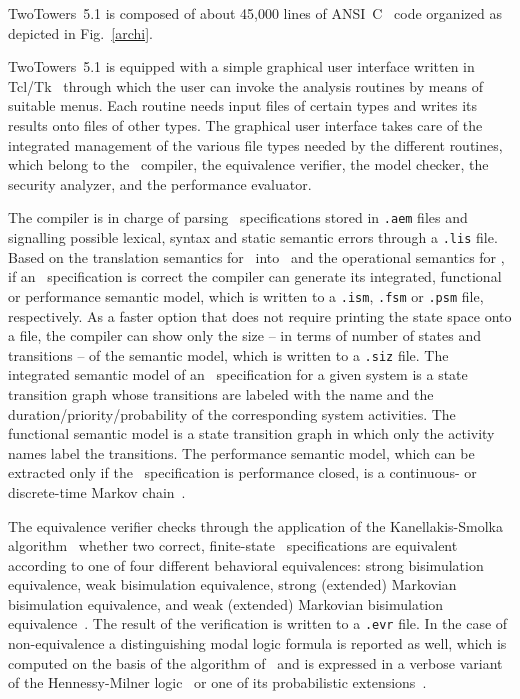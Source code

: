 TwoTowers~5.1 is composed of about 45,000 lines of ANSI~C~\cite{KR} code organized as depicted in
Fig.~\ref{archi}.

TwoTowers~5.1 is equipped with a simple graphical user interface written in Tcl/Tk~\cite{Ous} through which
the user can invoke the analysis routines by means of suitable menus. Each routine needs input files of
certain types and writes its results onto files of other types. The graphical user interface takes care of
the integrated management of the various file types needed by the different routines, which belong to the
\aemilia\ compiler, the equivalence verifier, the model checker, the security analyzer, and the performance
evaluator.

The compiler is in charge of parsing \aemilia\ specifications stored in {\tt .aem} files and signalling
possible lexical, syntax and static semantic errors through a {\tt .lis} file. Based on the translation
semantics for \aemilia\ into \empagr\ and the operational semantics for \empagr, if an \aemilia\
specification is correct the compiler can generate its integrated, functional or performance semantic model,
which is written to a {\tt .ism}, {\tt .fsm} or {\tt .psm} file, respectively. As a faster option that does
not require printing the state space onto a file, the compiler can show only the size -- in terms of number
of states and transitions -- of the semantic model, which is written to a {\tt .siz} file. The integrated
semantic model of an \aemilia\ specification for a given system is a state transition graph whose
transitions are labeled with the name and the duration/priority/probability of the corresponding system
activities. The functional semantic model is a state transition graph in which only the activity names label
the transitions. The performance semantic model, which can be extracted only if the \aemilia\ specification
is performance closed, is a continuous- or discrete-time Markov chain~\cite{Ste1}.

The equivalence verifier checks through the application of the Kanellakis-Smolka algorithm~\cite{KS}
whether two correct, finite-state \aemilia\ specifications are equivalent according to one of four different
behavioral equivalences: strong bisimulation equivalence, weak bisimulation equivalence, strong (extended)
Markovian bisimulation equivalence, and weak (extended) Markovian bisimulation
equivalence~\cite{Mil,BB2,Ber3}. The result of the verification is written to a {\tt .evr} file. In the case
of non-equivalence a distinguishing modal logic formula is reported as well, which is computed on the basis
of the algorithm of~\cite{Cle} and is expressed in a verbose variant of the Hennessy-Milner logic~\cite{HM}
or one of its probabilistic extensions~\cite{LS,CGH}.


